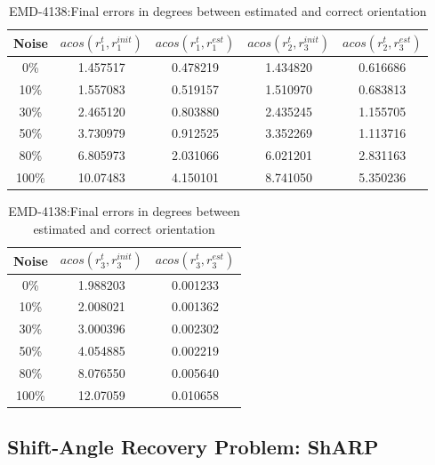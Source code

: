 \documentclass[twoside]{iitbreport}
\begin{document}
\begin{table}[H]
    \centering
     \begin{tabular}{||c c c c c||} 
             \hline
             Noise 
             & $acos(r_1^{t},r_1^{init})$ 
             & $acos(r_1^{t},r_1^{est})$
             & $acos(r_2^{t},r_3^{init})$ 
             & $acos(r_2^{t},r_3^{est})$
            \\ 
            \hline\hline
            0\%  &1.457517&0.478219&1.434820 &0.616686\\ \hline
            10\% &1.557083&0.519157&1.510970 &0.683813\\ \hline
            30\% &2.465120&0.803880&2.435245 &1.155705\\ \hline
            50\% &3.730979&0.912525&3.352269 &1.113716\\ \hline
            80\% &6.805973&2.031066&6.021201 &2.831163\\ \hline
            100\%&10.07483&4.150101&8.741050 &5.350236\\ \hline
            \hline
    \end{tabular}
    \begin{tabular}{||c c c||} 
             \hline
             Noise 
             & $acos(r_3^{t},r_3^{init})$ 
             & $acos(r_3^{t},r_3^{est})$
            \\ 
            \hline\hline
            0\%  &1.988203&0.001233\\ \hline
            10\% &2.008021&0.001362\\ \hline
            30\% &3.000396&0.002302\\ \hline
            50\% &4.054885&0.002219\\ \hline
            80\% &8.076550&0.005640\\ \hline
            100\%&12.07059&0.010658\\ \hline
            \hline
    \end{tabular}
    \captionsetup{justification=centering}
    \caption{EMD-4138:Final errors in degrees between estimated and correct orientation}
    \label{tbl:our_arp_4138_result-acos-rot}
\end{table}

\subsection{Shift-Angle Recovery Problem: ShARP}\label{subsec:ShARP-EXP}
\end{document}
